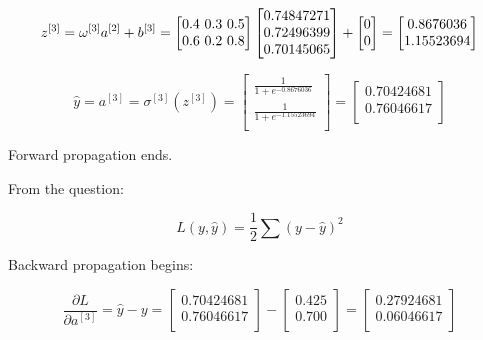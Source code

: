 \documentclass{article}
\begin{document}
\[
    z^{[3]} = \omega^{[3]} a^{[2]} + b^{[3]} = \begin{bmatrix}
        0.4 $ 0.3 $ 0.5 \\
        0.6 $ 0.2 $ 0.8 \\
    \end{bmatrix}
    \begin{bmatrix}
        0.74847271 \\
        0.72496399 \\
        0.70145065 \\
    \end{bmatrix}
    + \begin{bmatrix}
        0 \\
        0 \\
    \end{bmatrix}
    = \begin{bmatrix}
        0.8676036  \\
        1.15523694 \\
    \end{bmatrix}
\]

\[
    \widehat{y} = a^{[3]} = \sigma^{[3]}(z^{[3]}) = \begin{bmatrix}
        \frac{1}{1+e^{-0.8676036}}  \\
        \frac{1}{1+e^{-1.15523694}} \\
    \end{bmatrix}
    = \begin{bmatrix}
        0.70424681 \\
        0.76046617 \\
    \end{bmatrix}
\]

Forward propagation ends.

From the question:

\[
    L(y, \widehat{y})=\frac{1}{2}\sum(y-\widehat{y})^2
\]

Backward propagation begins:

\[
    \frac{\partial L}{\partial a^{[3]}}=\widehat{y}-y=\begin{bmatrix}
        0.70424681 \\
        0.76046617 \\
    \end{bmatrix}
    - \begin{bmatrix}
        0.425 \\
        0.700 \\
    \end{bmatrix}
    = \begin{bmatrix}
        0.27924681 \\
        0.06046617 \\
    \end{bmatrix}
\]
\end{document}
